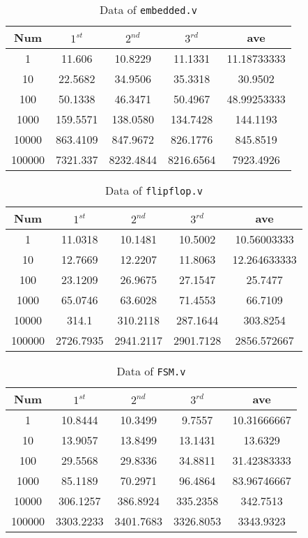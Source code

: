 \begin{table}[htbp]
    \centering
    \begin{tabular}{c|c|c|c|c}
    \hline
        Num & $1^{st}$ &$2^{nd}$ &$3^{rd}$ &ave\\
        \hline
        1 &  11.606&	10.8229	&11.1331&	11.18733333\\
        10 &22.5682&	34.9506	&35.3318&	30.9502\\
        100 &50.1338&	46.3471	&50.4967&	48.99253333\\
        1000 &159.5571&	138.0580&	134.7428&	144.1193\\
        10000 &863.4109	&847.9672&	826.1776&	845.8519\\
        100000 & 7321.337&	8232.4844&	8216.6564&	7923.4926\\
    \end{tabular}
    \caption{\footnotesize Data of \texttt{embedded.v}}
\end{table}
\begin{table}[htbp]
    \centering
    \begin{tabular}{c|c|c|c|c}
    \hline
        Num & $1^{st}$ &$2^{nd}$ &$3^{rd}$ &ave\\
        \hline
        1 &  11.0318&	10.1481	&10.5002&	10.56003333\\
        10 &12.7669	&12.2207&	11.8063&	12.264633333\\
        100 &23.1209&	26.9675	&27.1547&	25.7477\\
        1000 &65.0746&	63.6028	&71.4553&	66.7109\\
        10000 &314.1	&310.2118&	287.1644&	303.8254\\
        100000 & 2726.7935&	2941.2117&	2901.7128&	2856.572667\\
    \end{tabular}
    \caption{\footnotesize Data of \texttt{flipflop.v}}
\end{table}
\begin{table}[htbp]
    \centering
    \begin{tabular}{c|c|c|c|c}
    \hline
        Num & $1^{st}$ &$2^{nd}$ &$3^{rd}$ &ave\\
        \hline
        1 &  10.8444&	10.3499	&9.7557	&10.31666667\\
        10 &13.9057&	13.8499&	13.1431	&13.6329\\
        100 &29.5568&	29.8336&	34.8811	&31.42383333\\
        1000 &85.1189&	70.2971&	96.4864	&83.96746667\\
        10000 &306.1257	&386.8924&	335.2358&	342.7513\\
        100000 & 3303.2233&	3401.7683&	3326.8053&	3343.9323\\
    \end{tabular}
    \caption{\footnotesize Data of \texttt{FSM.v}}
\end{table}

